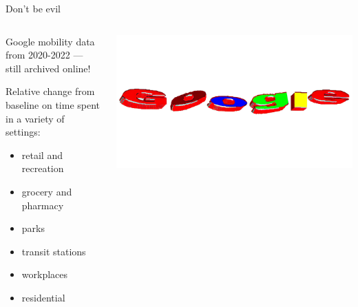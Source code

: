 \documentclass[
  ignorenonframetext,
]{beamer}
\providecommand{\tightlist}{%
  \setlength{\itemsep}{0pt}\setlength{\parskip}{0pt}}\usepackage{longtable,booktabs,array}
\begin{document}
\begin{frame}{Don't be evil}
\label{dont-be-evil}
\begin{columns}[T]
\begin{column}{0.6\textwidth}
Google mobility data from 2020-2022 --- still archived online!\newline

Relative change from baseline on time spent in a variety of
settings:\newline

\begin{itemize}
\tightlist
\item
  retail and recreation
\item
  grocery and pharmacy
\item
  parks
\item
  transit stations
\item
  workplaces
\item
  residential
\end{itemize}
\end{column}

\begin{column}{0.4\textwidth}
\includegraphics{images/google.jpg}
\end{column}
\end{columns}
\end{frame}
\end{document}
